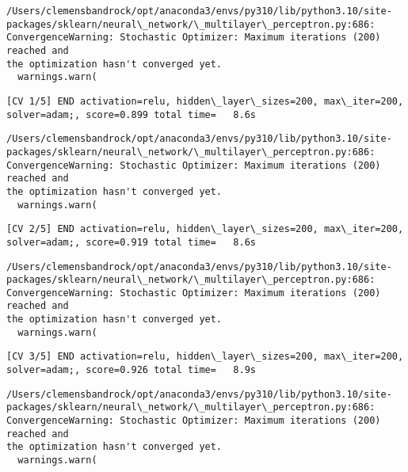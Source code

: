 \documentclass[11pt]{article}
\begin{document}
    \begin{Verbatim}[commandchars=\\\{\}]
/Users/clemensbandrock/opt/anaconda3/envs/py310/lib/python3.10/site-
packages/sklearn/neural\_network/\_multilayer\_perceptron.py:686:
ConvergenceWarning: Stochastic Optimizer: Maximum iterations (200) reached and
the optimization hasn't converged yet.
  warnings.warn(
    \end{Verbatim}

    \begin{Verbatim}[commandchars=\\\{\}]
[CV 1/5] END activation=relu, hidden\_layer\_sizes=200, max\_iter=200,
solver=adam;, score=0.899 total time=   8.6s
    \end{Verbatim}

    \begin{Verbatim}[commandchars=\\\{\}]
/Users/clemensbandrock/opt/anaconda3/envs/py310/lib/python3.10/site-
packages/sklearn/neural\_network/\_multilayer\_perceptron.py:686:
ConvergenceWarning: Stochastic Optimizer: Maximum iterations (200) reached and
the optimization hasn't converged yet.
  warnings.warn(
    \end{Verbatim}

    \begin{Verbatim}[commandchars=\\\{\}]
[CV 2/5] END activation=relu, hidden\_layer\_sizes=200, max\_iter=200,
solver=adam;, score=0.919 total time=   8.6s
    \end{Verbatim}

    \begin{Verbatim}[commandchars=\\\{\}]
/Users/clemensbandrock/opt/anaconda3/envs/py310/lib/python3.10/site-
packages/sklearn/neural\_network/\_multilayer\_perceptron.py:686:
ConvergenceWarning: Stochastic Optimizer: Maximum iterations (200) reached and
the optimization hasn't converged yet.
  warnings.warn(
    \end{Verbatim}

    \begin{Verbatim}[commandchars=\\\{\}]
[CV 3/5] END activation=relu, hidden\_layer\_sizes=200, max\_iter=200,
solver=adam;, score=0.926 total time=   8.9s
    \end{Verbatim}

    \begin{Verbatim}[commandchars=\\\{\}]
/Users/clemensbandrock/opt/anaconda3/envs/py310/lib/python3.10/site-
packages/sklearn/neural\_network/\_multilayer\_perceptron.py:686:
ConvergenceWarning: Stochastic Optimizer: Maximum iterations (200) reached and
the optimization hasn't converged yet.
  warnings.warn(
    \end{Verbatim}
\end{document}
